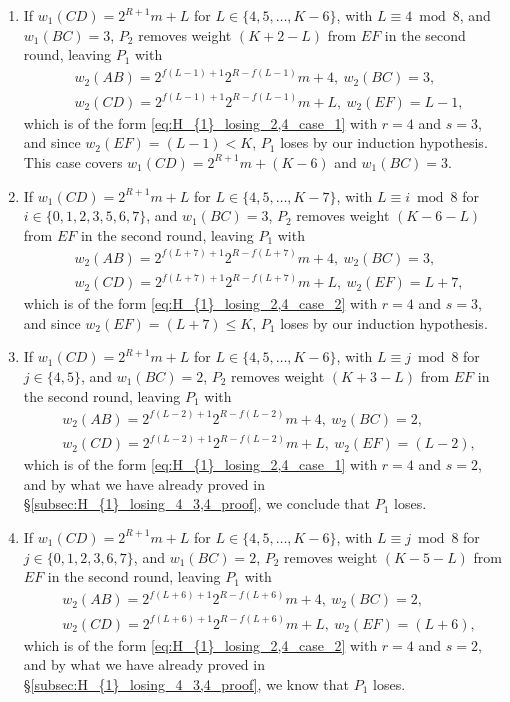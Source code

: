 \documentclass[11pt,reqno]{amsart}
\theoremstyle{definition}
\theoremstyle{definition}
\begin{document}
\begin{enumerate}
\begin{enumerate}
\item If $w_{1}(CD)=2^{R+1}m+L$ for $L \in \{4,5,\ldots,K-6\}$, with $L\equiv 4 \bmod 8$, and $w_{1}(BC)=3$, $P_{2}$ removes weight $(K+2-L)$ from $EF$ in the second round, leaving $P_{1}$ with
\begin{align}
{}&w_{2}(AB)=2^{f(L-1)+1}2^{R-f(L-1)}m+4,\ w_{2}(BC)=3,\nonumber\\
{}&w_{2}(CD)=2^{f(L-1)+1}2^{R-f(L-1)}m+L,\ w_{2}(EF)=L-1,\nonumber
\end{align}
which is of the form \eqref{eq:H_{1}_losing_2,4_case_1} with $r=4$ and $s=3$, and since $w_{2}(EF)=(L-1)<K$, $P_{1}$ loses by our induction hypothesis. This case covers $w_{1}(CD)=2^{R+1}m+(K-6)$ and $w_{1}(BC)=3$.

\item If $w_{1}(CD)=2^{R+1}m+L$ for $L \in \{4,5,\ldots,K-7\}$, with $L \equiv i \bmod 8$ for $i \in \{0,1,2,3,5,6,7\}$, and $w_{1}(BC)=3$, $P_{2}$ removes weight $(K-6-L)$ from $EF$ in the second round, leaving $P_{1}$ with
\begin{align}
{}&w_{2}(AB)=2^{f(L+7)+1}2^{R-f(L+7)}m+4,\ w_{2}(BC)=3,\nonumber\\
{}&w_{2}(CD)=2^{f(L+7)+1}2^{R-f(L+7)}m+L,\ w_{2}(EF)=L+7,\nonumber
\end{align}
which is of the form \eqref{eq:H_{1}_losing_2,4_case_2} with $r=4$ and $s=3$, and since $w_{2}(EF)=(L+7)\leqslant K$, $P_{1}$ loses by our induction hypothesis. 

\item If $w_{1}(CD)=2^{R+1}m+L$ for $L \in \{4,5,\ldots,K-6\}$, with $L \equiv j \bmod 8$ for $j \in \{4,5\}$, and $w_{1}(BC)=2$, $P_{2}$ removes weight $(K+3-L)$ from $EF$ in the second round, leaving $P_{1}$ with 
\begin{align}
{}&w_{2}(AB)=2^{f(L-2)+1}2^{R-f(L-2)}m+4,\ w_{2}(BC)=2,\nonumber\\
{}&w_{2}(CD)=2^{f(L-2)+1}2^{R-f(L-2)}m+L,\ w_{2}(EF)=(L-2),\nonumber
\end{align}
which is of the form \eqref{eq:H_{1}_losing_2,4_case_1} with $r=4$ and $s=2$, and by what we have already proved in \S\ref{subsec:H_{1}_losing_4_3,4_proof}, we conclude that $P_{1}$ loses. 

\item If $w_{1}(CD)=2^{R+1}m+L$ for $L \in \{4,5,\ldots,K-6\}$, with $L \equiv j \bmod 8$ for $j \in \{0,1,2,3,6,7\}$, and $w_{1}(BC)=2$, $P_{2}$ removes weight $(K-5-L)$ from $EF$ in the second round, leaving $P_{1}$ with
\begin{align}
{}&w_{2}(AB)=2^{f(L+6)+1}2^{R-f(L+6)}m+4,\ w_{2}(BC)=2,\nonumber\\
{}&w_{2}(CD)=2^{f(L+6)+1}2^{R-f(L+6)}m+L,\ w_{2}(EF)=(L+6),\nonumber
\end{align}
which is of the form \eqref{eq:H_{1}_losing_2,4_case_2} with $r=4$ and $s=2$, and by what we have already proved in \S\ref{subsec:H_{1}_losing_4_3,4_proof}, we know that $P_{1}$ loses.


\end{enumerate}
\end{enumerate}
\end{document}
